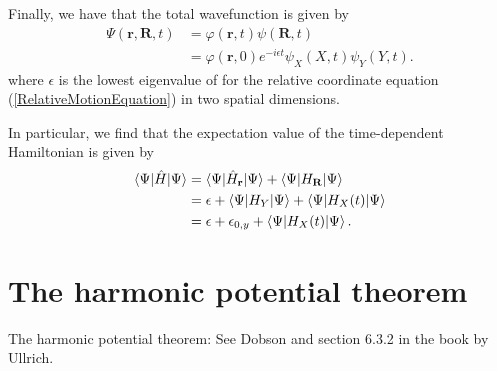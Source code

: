 \documentclass[aip,jcp,reprint,floatfix]{revtex4-1}
\begin{document}
\begin{appendices}
Finally, we have that the total wavefunction is given by 
\begin{align}
 \Psi(\mathbf{r},\mathbf{R},t) &= \varphi(\mathbf{r},t) \psi(\mathbf{R},t) \nonumber \\
 &= \varphi(\mathbf{r},0)e^{-i\epsilon t} \psi_X(X,t) \psi_Y(Y,t).
\end{align}
where $\epsilon$ is the lowest eigenvalue of for the relative coordinate equation (\ref{RelativeMotionEquation}) in two spatial dimensions.

In particular, we find that the expectation value of the time-dependent Hamiltonian is given by 
\begin{align}
    \braket{\Psi|\hat{H}|\Psi} &= \braket{\Psi|\hat{H}_\mathbf{r}|\Psi} + \braket{\Psi|H_\mathbf{R}|\Psi} \nonumber \\ 
    &= \epsilon + \braket{\Psi|H_Y|\Psi} + \braket{\Psi|H_X(t)|\Psi} \nonumber \\
    &= \epsilon + \epsilon_{0,y} + \braket{\Psi|H_X(t)|\Psi}.
\end{align}

\section{The harmonic potential theorem}
The harmonic potential theorem: See Dobson\cite{HarmonicPotentialTheorem} and section 6.3.2 in the book by Ullrich\cite{TD_DFT_Ullrich_Book}.


\end{appendices}
\newpage


\end{document}
